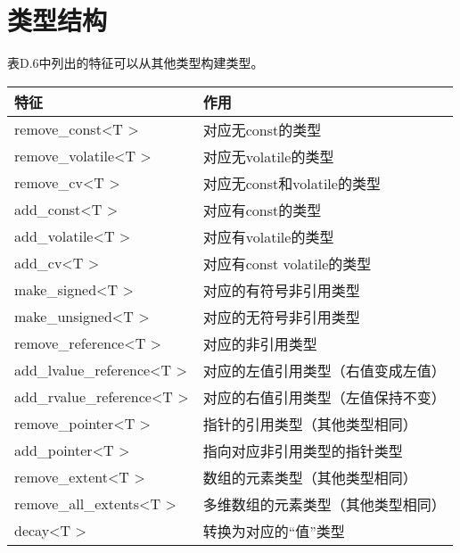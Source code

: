 \section{类型结构}

表D.6中列出的特征可以从其他类型构建类型。

\begin{table}[H]
	\begin{center}
	\begin{tabular}{l|l}
		\hline
		\textbf{特征}                                    & \textbf{作用}                                                \\ \hline
		remove\_const\textless{}T \textgreater{}          & 对应无const的类型                               \\ \hline
		remove\_volatile\textless{}T \textgreater{}       & 对应无volatile的类型                            \\ \hline
		remove\_cv\textless{}T \textgreater{}             & 对应无const和volatile的类型                  \\ \hline
		add\_const\textless{}T \textgreater{}             & 对应有const的类型                                       \\ \hline
		add\_volatile\textless{}T \textgreater{}          & 对应有volatile的类型                                    \\ \hline
		add\_cv\textless{}T \textgreater{}                & 对应有const volatile的类型                              \\ \hline
		make\_signed\textless{}T \textgreater{}           & 对应的有符号非引用类型                         \\ \hline
		make\_unsigned\textless{}T \textgreater{}         & 对应的无符号非引用类型                       \\ \hline
		remove\_reference\textless{}T \textgreater{}      & 对应的非引用类型                                \\ \hline
		add\_lvalue\_reference\textless{}T \textgreater{} & 对应的左值引用类型（右值变成左值）   \\ \hline
		add\_rvalue\_reference\textless{}T \textgreater{} & 对应的右值引用类型（左值保持不变）   \\ \hline
		remove\_pointer\textless{}T \textgreater{}        & 指针的引用类型（其他类型相同）               \\ \hline
		add\_pointer\textless{}T \textgreater{}           & 指向对应非引用类型的指针类型             \\ \hline
		remove\_extent\textless{}T \textgreater{}         & 数组的元素类型（其他类型相同）                 \\ \hline
		remove\_all\_extents\textless{}T \textgreater{}   & 多维数组的元素类型（其他类型相同） \\ \hline
		decay\textless{}T \textgreater{}                  & 转换为对应的“值”类型                     \\ \hline
	\end{tabular}
	\end{center}
\end{table}

